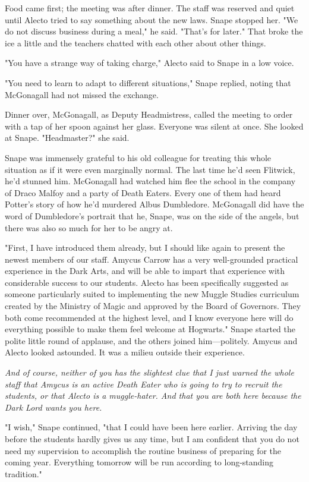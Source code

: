 Food came first; the meeting was after dinner. The staff was reserved and quiet until Alecto tried to say something about the new laws. Snape stopped her. "We do not discuss business during a meal," he said. "That's for later." That broke the ice a little and the teachers chatted with each other about other things.

"You have a strange way of taking charge," Alecto said to Snape in a low voice.

"You need to learn to adapt to different situations," Snape replied, noting that McGonagall had not missed the exchange.

Dinner over, McGonagall, as Deputy Headmistress, called the meeting to order with a tap of her spoon against her glass. Everyone was silent at once. She looked at Snape. "Headmaster?" she said.

Snape was immensely grateful to his old colleague for treating this whole situation as if it were even marginally normal. The last time he'd seen Flitwick, he'd stunned him. McGonagall had watched him flee the school in the company of Draco Malfoy and a party of Death Eaters. Every one of them had heard Potter's story of how he'd murdered Albus Dumbledore. McGonagall did have the word of Dumbledore's portrait that he, Snape, was on the side of the angels, but there was also so much for her to be angry at.

"First, I have introduced them already, but I should like again to present the newest members of our staff. Amycus Carrow has a very well-grounded practical experience in the Dark Arts, and will be able to impart that experience with considerable success to our students. Alecto has been specifically suggested as someone particularly suited to implementing the new Muggle Studies curriculum created by the Ministry of Magic and approved by the Board of Governors. They both come recommended at the highest level, and I know everyone here will do everything possible to make them feel welcome at Hogwarts." Snape started the polite little round of applause, and the others joined him—politely. Amycus and Alecto looked astounded. It was a milieu outside their experience.

\emph{And of course, neither of you has the slightest clue that I just warned the whole staff that Amycus is an active Death Eater who is going to try to recruit the students, or that Alecto is a muggle-hater. And that you are both here because the Dark Lord wants you here.}

"I wish," Snape continued, "that I could have been here earlier. Arriving the day before the students hardly gives us any time, but I am confident that you do not need my supervision to accomplish the routine business of preparing for the coming year. Everything tomorrow will be run according to long-standing tradition."

